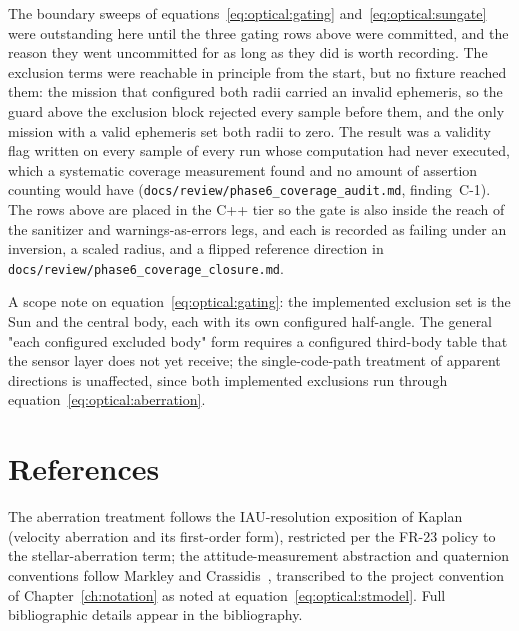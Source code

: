 The boundary sweeps of equations~\eqref{eq:optical:gating}
and~\eqref{eq:optical:sungate} were outstanding here until the three gating
rows above were committed, and the reason they went uncommitted for as long
as they did is worth recording. The exclusion terms were reachable in
principle from the start, but no fixture reached them: the mission that
configured both radii carried an invalid ephemeris, so the guard above the
exclusion block rejected every sample before them, and the only mission with
a valid ephemeris set both radii to zero. The result was a validity flag
written on every sample of every run whose computation had never executed,
which a systematic coverage measurement found and no amount of assertion
counting would have (\texttt{docs/review/phase6\_coverage\_audit.md},
finding~C-1). The rows above are placed in the C++ tier so the gate is also
inside the reach of the sanitizer and warnings-as-errors legs, and each is
recorded as failing under an inversion, a scaled radius, and a flipped
reference direction in
\texttt{docs/review/phase6\_coverage\_closure.md}.

A scope note on equation~\eqref{eq:optical:gating}: the implemented
exclusion set is the Sun and the central body, each with its own
configured half-angle. The general "each configured excluded body" form
requires a configured third-body table that the sensor layer does not yet
receive; the single-code-path treatment of apparent directions is
unaffected, since both implemented exclusions run through
equation~\eqref{eq:optical:aberration}.

\section{References}
\label{sec:optical:references}

The aberration treatment follows the IAU-resolution exposition of
Kaplan~\cite{kaplan2005} (velocity aberration and its first-order form),
restricted per the FR-23 policy to the stellar-aberration term; the
attitude-measurement abstraction and quaternion conventions follow
Markley and Crassidis~\cite{markley2014}, transcribed to the project
convention of Chapter~\ref{ch:notation} as noted at
equation~\eqref{eq:optical:stmodel}. Full bibliographic details appear
in the bibliography.
